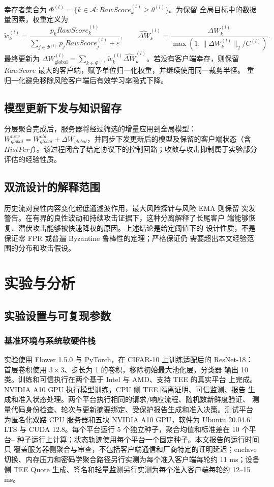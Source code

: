 \documentclass[11pt, a4paper, UTF8, fontset=fandol]{ctexart}
\begin{document}
幸存者集合为
$\Phi^{(l)}=\{k\in\mathcal{A}:RawScore_k^{(t)}\geq\theta^{(l)}\}$。为保留
全局目标中的数据量因素，权重定义为
\begin{equation}
    \tilde{w}_k^{(l)}=
    \frac{p_kRawScore_k^{(t)}}{\sum_{j\in\Phi^{(l)}}p_jRawScore_j^{(t)}
    +\varepsilon},\qquad
    \widehat{\Delta W}_k^{(l)}=
    \frac{\Delta W_k^{(l)}}{\max(1,\|\Delta W_k^{(l)}\|_2/C^{(l)})}.
\end{equation}
最终更新为
$\Delta W_{\mathrm{global}}^{(l)}
=\sum_{k\in\Phi^{(l)}}\tilde{w}_k^{(l)}
\widehat{\Delta W}_k^{(l)}$。若没有客户端幸存，则保留
$RawScore$ 最大的客户端，赋予单位归一化权重，并继续使用同一裁剪半径。
重归一化避免移除风险客户端后有效学习率隐式下降。

\subsection{模型更新下发与知识留存}
分层聚合完成后，服务器将经过筛选的增量应用到全局模型：$W_{global}^{new}=W_{global}^{old}+\Delta W_{global}$，并同步下发更新后的模型及保留的客户端状态（含 $HistPerf$）。该过程闭合了给定协议下的控制回路；收敛与攻击抑制属于实验部分评估的经验性质。

\subsection{双流设计的解释范围}
历史流对良性内容变化起低通滤波作用，最大风险探针与风险 EMA 则保留
突发警告。在有界的良性波动和持续攻击证据下，这种分离解释了长尾客户
端能够恢复、潜伏攻击能够被快速降权的原因。上述结论是给定阈值下的
设计性质，不是保证零 FPR 或普遍 Byzantine 鲁棒性的定理；严格保证仍
需要超出本文经验范围的分布和攻击假设。

\section{实验与分析}
\label{sec:experiments}
\subsection{实验设置与可复现参数}

\subsubsection{基准环境与系统软硬件栈}
实验使用 Flower 1.5.0 与 PyTorch，在 CIFAR-10 上训练适配后的 ResNet-18：
首层卷积使用 $3\times3$、步长为 1 的卷积，移除初始最大池化层，分类器
输出 10 类。训练和可信执行在两个基于 Intel 与 AMD、支持 TEE 的真实平台
上完成。NVIDIA A10 GPU 执行模型训练，CPU 侧 TEE 隔离证明、可信监测、报告
生成和准入状态处理。两个平台执行相同的请求/响应流程、随机数新鲜度验证、
测量代码身份检查、轮次与更新摘要绑定、受保护报告生成和准入决策。测试平台
为匿名化双路 CPU 服务器和五块 NVIDIA A10 GPU，软件为 Ubuntu 20.04.6 LTS
与 CUDA 12.8。每个平台运行 5 个独立种子，聚合均值和标准差在 10 个平台--
种子运行上计算；状态轨迹使用每个平台一个固定种子。本文报告的运行时间只
覆盖服务器侧聚合与审查，不包括客户端通信和厂商特定的证明延迟；enclave
切换、内存压力和密码学聚合路径另行实测为每个准入客户端每轮约 11 ms；设备侧 TEE Quote 生成、签名和轻量监测另行实测为每个准入客户端每轮约 12--15 ms。
\end{document}
